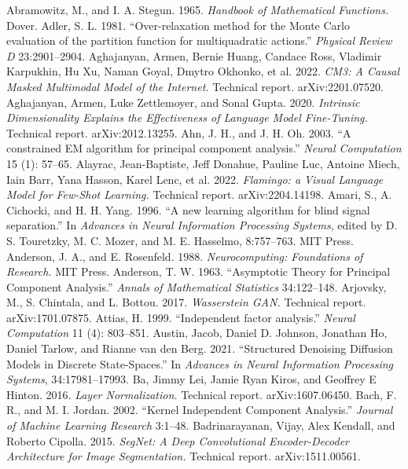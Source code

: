  Abramowitz, M., and I. A. Stegun. 1965. \emph{Handbook of Mathematical Functions.} Dover.
 Adler, S. L. 1981. ``Over-relaxation method for the Monte Carlo evaluation of the partition function for multiquadratic actions.'' \emph{Physical Review D} 23:2901--2904.
 Aghajanyan, Armen, Bernie Huang, Candace Ross, Vladimir Karpukhin, Hu Xu, Naman Goyal, Dmytro Okhonko, et al. 2022. \emph{CM3: A Causal Masked Multimodal Model of the Internet.} Technical report. arXiv:2201.07520.
 Aghajanyan, Armen, Luke Zettlemoyer, and Sonal Gupta. 2020. \emph{Intrinsic Dimensionality Explains the Effectiveness of Language Model Fine-Tuning.} Technical report. arXiv:2012.13255.
 Ahn, J. H., and J. H. Oh. 2003. ``A constrained EM algorithm for principal component analysis.'' \emph{Neural Computation} 15 (1): 57--65.
 Alayrac, Jean-Baptiste, Jeff Donahue, Pauline Luc, Antoine Miech, Iain Barr, Yana Hasson, Karel Lenc, et al. 2022. \emph{Flamingo: a Visual Language Model for Few-Shot Learning.} Technical report. arXiv:2204.14198.
 Amari, S., A. Cichocki, and H. H. Yang. 1996. ``A new learning algorithm for blind signal separation.'' In \emph{Advances in Neural Information Processing Systems}, edited by D. S. Touretzky, M. C. Mozer, and M. E. Hasselmo, 8:757--763. MIT Press.
 Anderson, J. A., and E. Rosenfeld. 1988. \emph{Neurocomputing: Foundations of Research.} MIT Press.
 Anderson, T. W. 1963. ``Asymptotic Theory for Principal Component Analysis.'' \emph{Annals of Mathematical Statistics} 34:122--148.
 Arjovsky, M., S. Chintala, and L. Bottou. 2017. \emph{Wasserstein GAN.} Technical report. arXiv:1701.07875.
 Attias, H. 1999. ``Independent factor analysis.'' \emph{Neural Computation} 11 (4): 803--851.
 Austin, Jacob, Daniel D. Johnson, Jonathan Ho, Daniel Tarlow, and Rianne van den Berg. 2021. ``Structured Denoising Diffusion Models in Discrete State-Spaces.'' In \emph{Advances in Neural Information Processing Systems}, 34:17981--17993.
 Ba, Jimmy Lei, Jamie Ryan Kiros, and Geoffrey E Hinton. 2016. \emph{Layer Normalization.} Technical report. arXiv:1607.06450.
 Bach, F. R., and M. I. Jordan. 2002. ``Kernel Independent Component Analysis.'' \emph{Journal of Machine Learning Research} 3:1--48.
 Badrinarayanan, Vijay, Alex Kendall, and Roberto Cipolla. 2015. \emph{SegNet: A Deep Convolutional Encoder-Decoder Architecture for Image Segmentation.} Technical report. arXiv:1511.00561.
